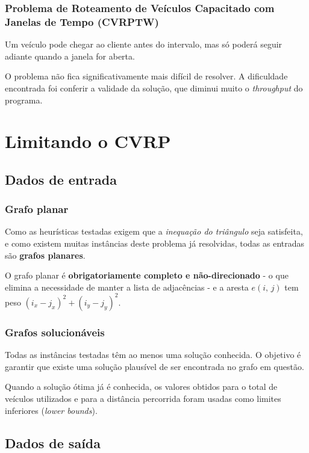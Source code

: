 \documentclass{beamer}
\begin{document}
\begin{frame} %
    \frametitle{Problema de Roteamento de Veículos Capacitado com Janelas de Tempo (CVRPTW)}

    Um veículo pode chegar ao cliente antes do intervalo, mas só poderá seguir adiante quando a janela for aberta.

    \medskip
    O problema não fica significativamente mais difícil de resolver. A dificuldade encontrada foi conferir a validade da solução, que diminui muito o \emph{throughput} do programa.

\end{frame}


\section{Limitando o CVRP}

\subsection{Dados de entrada}

\begin{frame} %
    \frametitle{Grafo planar}

    Como as heurísticas testadas exigem que a \emph{inequação do triângulo} seja satisfeita, e como existem muitas instâncias deste problema já resolvidas, todas as entradas são \textbf{grafos planares}.

    \bigskip
    O grafo planar é \textbf{obrigatoriamente completo e não-direcionado} - o que elimina a necessidade de manter a lista de adjacências - e a aresta \(e(i, \, j)\) tem peso \((i_{x} - j_{x})^{2} + (i_{y} - j_{y})^{2}\).

\end{frame}


\begin{frame} %
    \frametitle{Grafos solucionáveis}

    Todas as instâncias testadas têm ao menos uma solução conhecida. O objetivo é garantir que existe uma solução plausível de ser encontrada no grafo em questão.

    \bigskip
    Quando a solução ótima já é conhecida, os valores obtidos para o total de veículos utilizados e para a distância percorrida foram usadas como limites inferiores (\emph{lower bounds}).

\end{frame}

\subsection{Dados de saída}
\end{document}
